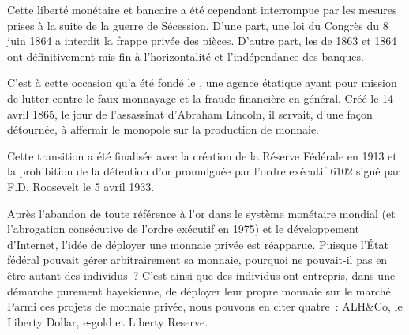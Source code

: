 Cette liberté monétaire et bancaire a été cependant interrompue par les mesures prises à la suite de la guerre de Sécession. D'une part, une loi du Congrès du 8 juin 1864 a interdit la frappe privée des pièces. D'autre part, les  de 1863 et 1864 ont définitivement mis fin à l'horizontalité et l'indépendance des banques. %

C'est à cette occasion qu'a été fondé le , une agence étatique ayant pour mission de lutter contre le faux-monnayage et la fraude financière en général. Créé le 14 avril 1865, le jour de l'assassinat d'Abraham Lincoln, il servait, d'une façon détournée, à affermir le monopole sur la production de monnaie.

Cette transition a été finalisée avec la création de la Réserve Fédérale en 1913 et la prohibition de la détention d'or promulguée par l'ordre exécutif 6102 signé par F.D. Roosevelt le 5 avril 1933.

Après l'abandon de toute référence à l'or dans le système monétaire mondial (et l'abrogation consécutive de l'ordre exécutif en 1975) et le développement d'Internet, l'idée de déployer une monnaie privée est réapparue. Puisque l'État fédéral pouvait gérer arbitrairement sa monnaie, pourquoi ne pouvait-il pas en être autant des individus~? C'est ainsi que des individus ont entrepris, dans une démarche purement hayekienne, de déployer leur propre monnaie sur le marché. Parmi ces projets de monnaie privée, nous pouvons en citer quatre~: ALH\&Co, le Liberty Dollar, e-gold et Liberty Reserve.

